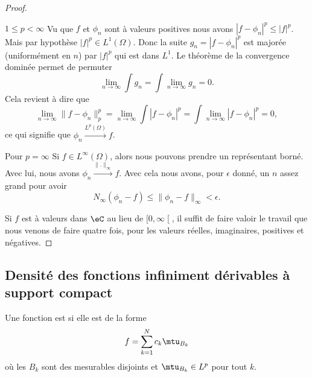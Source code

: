 \begin{proof}
    \begin{subproof}
        \item[\( 1\leq p<\infty\)]
            Vu que \( f\) et \( \phi_n\) sont à valeurs positives nous avons \( | f-\phi_n |^p\leq | f |^p\). Mais par hypothèse \( | f |^p\in L^1(\Omega)\). Donc la suite \( g_n=| f-\phi_n |^p\) est majorée (uniformément en \( n\)) par \( | f |^p\) qui est dans \( L^1\). Le théorème de la convergence dominée permet de permuter
            \begin{equation}
                \lim_{n\to \infty} \int g_n=\int \lim_{n\to \infty} g_n=0.
            \end{equation}
            Cela revient à dire que
            \begin{equation}
                \lim_{n\to \infty} \| f-\phi_n \|^p_p=\lim_{n\to \infty} \int| f-\phi_n |^p=\int\lim_{n\to \infty} | f-\phi_n |^p=0,
            \end{equation}
            ce qui signifie que \( \phi_n\stackrel{L^p(\Omega)}{\longrightarrow}f\).
        \item[Pour \( p=\infty\)]
            Si \( f\in L^{\infty}(\Omega)\), alors nous pouvons prendre un représentant borné. Avec lui, nous avons \( \phi_n\stackrel{\| . \|_{\infty}}{\longrightarrow}f\). Avec cela nous avons, pour \( \epsilon\) donné, un \( n\) assez grand pour avoir
            \begin{equation}
                N_{\infty}(\phi_n-f)\leq \| \phi_n-f \|_{\infty}<\epsilon.
            \end{equation}
    \end{subproof}
    Si \( f\) est à valeurs dans \( \eC\) au lieu de \( \mathopen[ 0 , \infty \mathclose[\), il suffit de faire valoir le travail que nous venons de faire quatre fois, pour les valeurs réelles, imaginaires, positives et négatives.
\end{proof}

\subsection{Densité des fonctions infiniment dérivables à support compact}

\begin{definition}
    Une fonction est  si elle est de la forme
    \begin{equation}
        f=\sum_{k=1}^Nc_k\mtu_{B_k}
    \end{equation}
    où les \( B_k\) sont des mesurables disjoints et \( \mtu_{B_k}\in L^p\) pour tout \( k\).
\end{definition}

